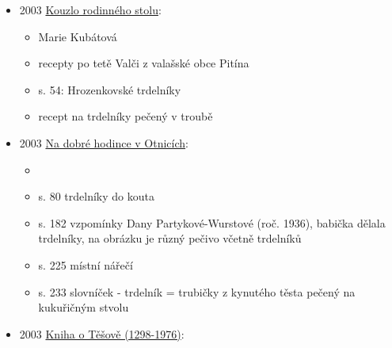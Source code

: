 \begin{itemize}
  \begin{itemize}
  \tightlist
  \item
    beletrie, 
  \item
    není online, 
  \item
    s. 20: omáčce a pokud budou mít urození páni chuť, mohu přinést i
    makové trdelníky. Dneska jsme pekli a má dcera Marta je vynikající
  \item
    s. 21: pokračoval s úsměvem další. „Ale až ochutnáte makový
    trdelník, to teprve něco uvidíte. Marta je kuchařka, že by si ji i
    král
  \item
    s. 22: ošatku pletenou ze slámy a na ní rozkrájený makový trdelník,
    sypaný skořicí a drcenými ořechy, v druhé košík s nakrájeným
  \item
    s. 23: Sedl si, natáhl ruku k ošatce a hladově si do úst strčil celý
    plátek trdelníku. Jeho přísný výraz zjihl. Obrátil se k dívce
  \end{itemize}
\item
  2003
  \href{https://ceskadigitalniknihovna.cz/uuid/uuid:99baad60-eb86-11e3-a2c6-005056827e51}{Kouzlo
  rodinného stolu}:

  \begin{itemize}
  \tightlist
  \item
    Marie Kubátová
  \item
    recepty po tetě Valči z valašské obce Pitína
  \item
    s. 54: Hrozenkovské trdelníky
  \item
    recept na trdelníky pečený v troubě
  \end{itemize}
\item
  2003
  \href{https://ceskadigitalniknihovna.cz/view/uuid:cc3e0ec0-084a-11e6-a611-005056827e51?page=uuid\%3Afaea6360-21de-11e6-8803-005056827e51&fulltext=trdeln\%C3\%ADk\%20OR\%20trdeln\%C3\%ADky\%20OR\%20trdeln\%C3\%ADk\%C5\%AF&source=mzk}{Na
  dobré hodince v Otnicích}:

  \begin{itemize}
  \tightlist
  \item
  \item
    s. 80 trdelníky do kouta
  \item
    s. 182 vzpomínky Dany Partykové-Wurstové (roč. 1936), babička dělala
    trdelníky, na obrázku je různý pečivo včetně trdelníků
  \item
    s. 225 místní nářečí
  \item
    s. 233 slovníček - trdelník = trubičky z kynutého těsta pečený na
    kukuřičným stvolu
  \end{itemize}
\item
  2003
  \href{https://ceskadigitalniknihovna.cz/uuid/uuid:d9f114f0-527a-11e3-ac69-005056827e51}{Kniha
  o Těšově (1298-1976)}:


\end{itemize}
